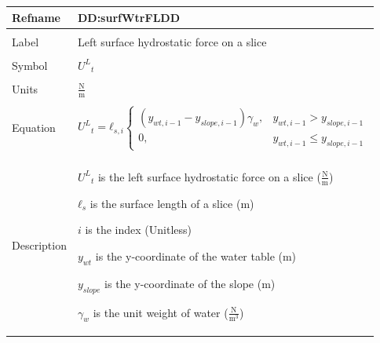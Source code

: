 \documentclass[12pt]{article}
\begin{document}
\noindent \begin{minipage}{\textwidth}
\begin{tabular}{p{} p{}}
\toprule \textbf{Refname} & \textbf{DD:surfWtrFLDD}
\label{DD:surfWtrFLDD}
\\ \midrule \\
Label & Left surface hydrostatic force on a slice
        \\ \midrule \\
        Symbol & ${{U^{L}}_{t}}$
                 \\ \midrule \\
                 Units & $\frac{\text{N}}{\text{m}}$
                         \\ \midrule \\
                         Equation & \begin{displaymath}
                                    {{U^{L}}_{t}}={ℓ_{s,i}} \begin{cases}
\left({y_{wt,i-1}}-{y_{slope,i-1}}\right) {γ_{w}}, & {y_{wt,i-1}}>{y_{slope,i-1}}\\
0, & {y_{wt,i-1}}\leq{}{y_{slope,i-1}}
\end{cases}
                                    \end{displaymath}
                                    \\ \midrule \\
                                    Description & \begin{symbDescription}
                                                  \item{${{U^{L}}_{t}}$ is the left surface hydrostatic force on a slice ($\frac{\text{N}}{\text{m}}$)}
                                                  \item{${ℓ_{s}}$ is the surface length of a slice (m)}
                                                  \item{$i$ is the index (Unitless)}
                                                  \item{${y_{wt}}$ is the y-coordinate of the water table (m)}
                                                  \item{${y_{slope}}$ is the y-coordinate of the slope (m)}
                                                  \item{${γ_{w}}$ is the unit weight of water ($\frac{\text{N}}{\text{m}^{3}}$)}
                                                  \end{symbDescription}

\end{tabular}
\end{minipage}
\end{document}
